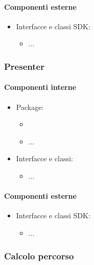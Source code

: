 \documentclass[../Funzionalita.tex]{subfiles}
\begin{document}
			
			\paragraph*{Componenti esterne}
			
			\begin{itemize}
				\item Interfacce e classi SDK:
				\begin{itemize}
					\item[] ...
				\end{itemize}
			\end{itemize}
		
		\subsubsection{Presenter}
		
			\paragraph*{Componenti interne}
			\begin{itemize}
			
				\item Package:
				\begin{itemize}
					\item[]
					\item[] ...
				\end{itemize}
				
				\item Interfacce e classi:
				\begin{itemize}
					\item[] ...
				\end{itemize}
				
			\end{itemize}
			
			
			\paragraph*{Componenti esterne}
			
			\begin{itemize}
				\item Interfacce e classi SDK:
				\begin{itemize}
					\item[] ...
				\end{itemize}
			\end{itemize}
					
		
		\subsubsection{Calcolo percorso}
		
\end{document}
